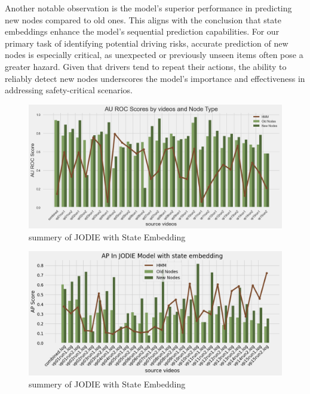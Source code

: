 Another notable observation is the model’s superior performance in predicting new nodes compared to old ones. This aligns with the conclusion that state embeddings enhance the model’s sequential prediction capabilities. For our primary task of identifying potential driving risks, accurate prediction of new nodes is especially critical, as unexpected or previously unseen items often pose a greater hazard. Given that drivers tend to repeat their actions, the ability to reliably detect new nodes underscores the model’s importance and effectiveness in addressing safety-critical scenarios.






\begin{figure}[h]
    \centering
    \includegraphics[width=\textwidth]{figures/05_JODIE_state_HMM_AUROC.png}
    \caption{summery of JODIE with State Embedding}
    \label{fig:JODIE_state_HMM_AUROC}
\end{figure}



\begin{figure}[h]
    \centering
    \includegraphics[width=\textwidth]{figures/05_JODIE_state_HMM_AP.png}
    \caption{summery of JODIE with State Embedding}
    \label{fig:JODIE_state_HMM_AP}
\end{figure}